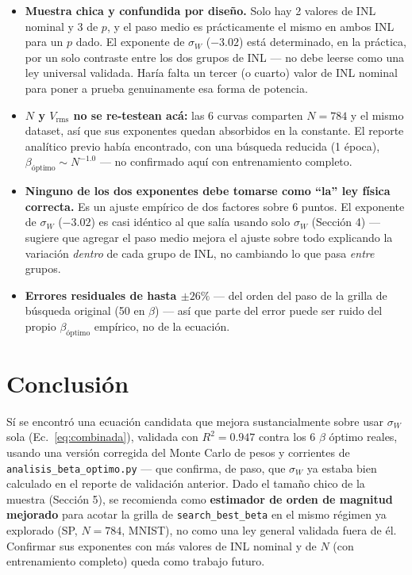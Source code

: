 \documentclass[11pt]{article}
\begin{document}
\begin{itemize}
\item \textbf{Muestra chica y confundida por diseño.} Solo hay 2 valores
  de INL nominal y 3 de $p$, y el paso medio es prácticamente el mismo en
  ambos INL para un $p$ dado. El exponente de $\sigma_W$ ($-3.02$) está
  determinado, en la práctica, por un solo contraste entre los dos grupos
  de INL --- no debe leerse como una ley universal validada. Haría falta
  un tercer (o cuarto) valor de INL nominal para poner a prueba
  genuinamente esa forma de potencia.
\item \textbf{$N$ y $V_{\mathrm{rms}}$ no se re-testean acá:} las 6 curvas
  comparten $N=784$ y el mismo dataset, así que sus exponentes quedan
  absorbidos en la constante. El reporte analítico previo había
  encontrado, con una búsqueda reducida (1 época),
  $\beta_{\text{óptimo}}\sim N^{-1.0}$ --- no confirmado aquí con
  entrenamiento completo.
\item \textbf{Ninguno de los dos exponentes debe tomarse como ``la'' ley
  física correcta.} Es un ajuste empírico de dos factores sobre 6 puntos.
  El exponente de $\sigma_W$ ($-3.02$) es casi idéntico al que salía usando
  solo $\sigma_W$ (Sección 4) --- sugiere que agregar el paso medio mejora
  el ajuste sobre todo explicando la variación \emph{dentro} de cada grupo
  de INL, no cambiando lo que pasa \emph{entre} grupos.
\item \textbf{Errores residuales de hasta $\pm26\%$} --- del orden del
  paso de la grilla de búsqueda original (50 en $\beta$) --- así que parte
  del error puede ser ruido del propio $\beta_{\text{óptimo}}$ empírico, no
  de la ecuación.
\end{itemize}

\section{Conclusión}

Sí se encontró una ecuación candidata que mejora sustancialmente sobre
usar $\sigma_W$ sola (Ec.~\ref{eq:combinada}), validada con $R^2=0.947$
contra los 6 $\beta$ óptimo reales, usando una versión corregida del Monte
Carlo de pesos y corrientes de \texttt{analisis\_beta\_optimo.py} --- que
confirma, de paso, que $\sigma_W$ ya estaba bien calculado en el reporte de
validación anterior. Dado el tamaño chico de la muestra (Sección 5), se
recomienda como \textbf{estimador de orden de magnitud mejorado} para
acotar la grilla de \texttt{search\_best\_beta} en el mismo régimen ya
explorado (SP, $N=784$, MNIST), no como una ley general validada fuera de
él. Confirmar sus exponentes con más valores de INL nominal y de $N$ (con
entrenamiento completo) queda como trabajo futuro.
\end{document}
